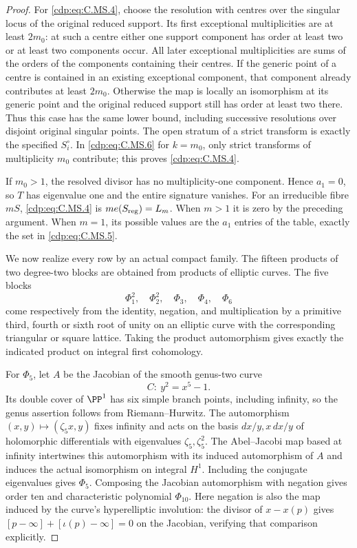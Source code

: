 \begin{proof}
For \eqref{cdp:eq:C.MS.4}, choose the resolution with centres
over the singular locus of the original reduced
support. Its first exceptional multiplicities
are at least $2m_0$: at such a centre either
one support component has order at least two
or at least two components occur. All later
exceptional multiplicities are sums of the
orders of the components containing their
centres. If the generic point of a centre is
contained in an existing exceptional component,
that component already contributes at least
$2m_0$. Otherwise the map is locally an
isomorphism at its generic point and the
original reduced support still has order at
least two there. Thus this case has the same
lower bound, including successive resolutions
over disjoint original singular points.
The open stratum of a strict
transform is exactly the specified
$S_i^\circ$. In \eqref{cdp:eq:C.MS.6} for $k=m_0$, only
strict transforms of multiplicity $m_0$
contribute; this proves \eqref{cdp:eq:C.MS.4}.

If $m_0>1$, the resolved divisor has no
multiplicity-one component. Hence $a_1=0$,
so $T$ has eigenvalue one and the entire
signature vanishes. For an irreducible
fibre $mS$, \eqref{cdp:eq:C.MS.4} is
$m e(S_{\rm reg})=L_m$. When $m>1$ it
is zero by the preceding argument. When
$m=1$, its possible values are the
$a_1$ entries of the table, exactly the
set in \eqref{cdp:eq:C.MS.5}.

We now realize every row by an actual compact
family. The fifteen products of two degree-two
blocks are obtained from products of elliptic
curves. The five blocks
\[
                 \Phi_1^2,\quad\Phi_2^2,\quad
                 \Phi_3,\quad\Phi_4,\quad\Phi_6
\]
come respectively from the identity, negation,
and multiplication by a primitive third, fourth
or sixth root of unity on an elliptic curve
with the corresponding triangular or square
lattice. Taking the product automorphism gives
exactly the indicated product on integral
first cohomology.

For $\Phi_5$, let $A$ be the Jacobian of
the smooth genus-two curve
\[
                           C:\ y^2=x^5-1.
\]
Its double cover of $\PP^1$ has six simple
branch points, including infinity, so the
genus assertion follows from Riemann--Hurwitz.
The automorphism $(x,y)\mapsto(\zeta_5x,y)$
fixes infinity and acts on the basis
$dx/y,x\,dx/y$ of holomorphic differentials
with eigenvalues $\zeta_5,\zeta_5^2$.
The Abel--Jacobi map based at infinity
intertwines this automorphism with its induced
automorphism of $A$ and induces the actual
isomorphism on integral $H^1$. Including the
conjugate eigenvalues gives $\Phi_5$.
Composing the Jacobian automorphism with
negation gives order ten and characteristic
polynomial $\Phi_{10}$. Here negation is also
the map induced by the curve's hyperelliptic
involution: the divisor of $x-x(p)$ gives
$[p-\infty]+[\iota(p)-\infty]=0$ on the
Jacobian, verifying that comparison explicitly.


\end{proof}
